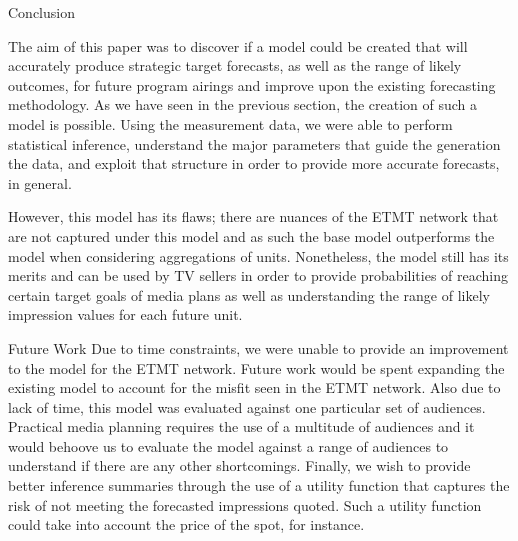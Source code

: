 \begin{chapter}{Conclusion}

The aim of this paper was to discover if a model could be created that will accurately
produce strategic target forecasts, as well as the range of likely outcomes, for future program airings
and improve upon the existing forecasting methodology.
As we have seen in the previous section, the creation of such a model is possible.
Using the measurement data, we were able to perform statistical inference, understand
the major parameters that guide the generation the data, and exploit that structure
in order to provide more accurate forecasts, in general.

However, this model has its flaws; there are nuances of the ETMT network that are not
captured under this model and as such the base model outperforms the model when considering
aggregations of units. Nonetheless, the model still has its merits and can be used by
TV sellers in order to provide probabilities of reaching certain target goals of media plans as well
as understanding the range of likely impression values for each future unit.

\begin{section}{Future Work}
  Due to time constraints, we were unable to provide an improvement to the model for the ETMT network.
  Future work would be spent expanding the existing model to account for the misfit seen in the ETMT network.
  Also due to lack of time, this model was evaluated against one particular set of audiences. Practical
  media planning requires the use of a multitude of audiences and it would behoove us to evaluate
  the model against a range of audiences to understand if there are any other shortcomings. Finally,
  we wish to provide better inference summaries through the use of a utility function that captures
  the risk of not meeting the forecasted impressions quoted. Such a utility function could take into account the
  price of the spot, for instance.
\end{section}

\end{chapter}